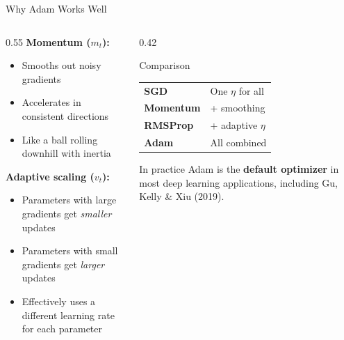 \documentclass[aspectratio=169]{beamer}
\begin{document}
%
%
\begin{frame}{Why Adam Works Well}

\begin{columns}
\begin{column}{0.55\textwidth}
\textbf{Momentum ($m_t$):}
\begin{itemize}
    \item Smooths out noisy gradients
    \item Accelerates in consistent directions
    \item Like a ball rolling downhill with inertia
\end{itemize}

\medskip
\textbf{Adaptive scaling ($v_t$):}
\begin{itemize}
    \item Parameters with large gradients get \emph{smaller} updates
    \item Parameters with small gradients get \emph{larger} updates
    \item Effectively uses a different learning rate for each parameter
\end{itemize}
\end{column}
\begin{column}{0.42\textwidth}
\begin{block}{Comparison}
\small
\begin{tabular}{l l}
\textbf{SGD} & One $\eta$ for all \\
\textbf{Momentum} & + smoothing \\
\textbf{RMSProp} & + adaptive $\eta$ \\
\textbf{Adam} & All combined \\
\end{tabular}
\end{block}

\vspace{0.3cm}
\begin{alertblock}{In practice}
Adam is the \textbf{default optimizer} in most deep learning applications, including Gu, Kelly \& Xiu (2019).
\end{alertblock}
\end{column}
\end{columns}
\end{frame}
%
\end{document}
